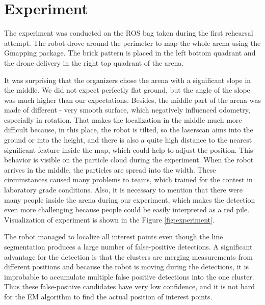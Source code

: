 \chapter{Experiment}

The experiment was conducted on the ROS bag taken during the first rehearsal attempt. The robot drove around the perimeter to map the whole arena using the Gmapping package. The brick pattern is placed in the left bottom quadrant and the drone delivery in the right top quadrant of the arena.

 It was surprising that the organizers chose the arena with a significant slope in the middle. We did not expect perfectly flat ground, but the angle of the slope was much higher than our expectations. Besides, the middle part of the arena was made of different - very smooth surface, which negatively influenced odometry, especially in rotation. That makes the localization in the middle much more difficult because, in this place, the robot is tilted, so the laserscan aims into the ground or into the height, and there is also a quite high distance to the nearest significant feature inside the map, which could help to adjust the position. This behavior is visible on the particle cloud during the experiment. When the robot arrives in the middle, the particles are spread into the width. These circumstances caused many problems to teams, which trained for the contest in laboratory grade conditions. Also, it is necessary to mention that there were many people inside the arena during our experiment, which makes the detection even more challenging because people could be easily interpreted as a red pile. Visualization of experiment is shown in the Figure \ref{fig:experiment}.

The robot managed to localize all interest points even though the line segmentation produces a large number of false-positive detections. A significant advantage for the detection is that the clusters are merging measurements from different positions and because the robot is moving during the detections, it is improbable to accumulate multiple false positive detections into the one cluster. Thus these false-positive candidates have very low confidence, and it is not hard for the EM algorithm to find the actual position of interest points.



